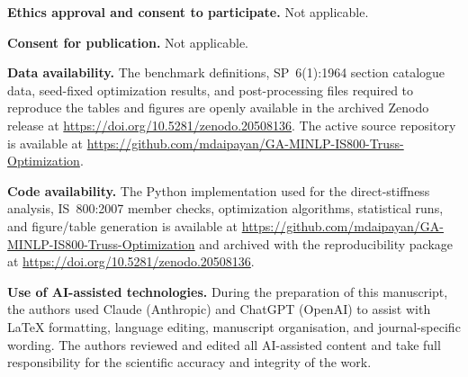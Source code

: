 \documentclass[10pt]{article}
\begin{document}
\begin{titlepage}
\vspace{0.45em}
\noindent\textbf{Ethics approval and consent to participate.} Not applicable.

\vspace{0.45em}
\noindent\textbf{Consent for publication.} Not applicable.

\vspace{0.45em}
\noindent\textbf{Data availability.} The benchmark definitions, SP~6(1):1964 section catalogue data, seed-fixed optimization results, and post-processing files required to reproduce the tables and figures are openly available in the archived Zenodo release at \url{https://doi.org/10.5281/zenodo.20508136}. The active source repository is available at \url{https://github.com/mdaipayan/GA-MINLP-IS800-Truss-Optimization}.

\vspace{0.45em}
\noindent\textbf{Code availability.} The Python implementation used for the direct-stiffness analysis, IS~800:2007 member checks, optimization algorithms, statistical runs, and figure/table generation is available at \url{https://github.com/mdaipayan/GA-MINLP-IS800-Truss-Optimization} and archived with the reproducibility package at \url{https://doi.org/10.5281/zenodo.20508136}.

\vspace{0.45em}
\noindent\textbf{Use of AI-assisted technologies.} During the preparation of this manuscript, the authors used Claude (Anthropic) and ChatGPT (OpenAI) to assist with \LaTeX{} formatting, language editing, manuscript organisation, and journal-specific wording. The authors reviewed and edited all AI-assisted content and take full responsibility for the scientific accuracy and integrity of the work.


\end{titlepage}
\end{document}
